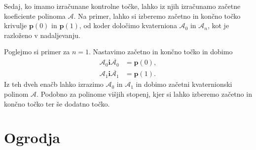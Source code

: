 \documentclass[mat1]{fmfdelo}
\newcommand{\ii}{\boldsymbol i}
\newcommand{\pp}{\boldsymbol p}
\newcommand{\A}{\mathcal A}
\begin{document}
\iffalse
Z višanjem stopnje začetnega polinoma, dobimo več prostih parametrov, kar lahko izkoristimo pri konstrukciji krivulje. Več o tem kasneje.
\fi
Sedaj, ko imamo izračunane kontrolne točke, lahko iz njih izračunamo začetne koeficiente polinoma $\A$. Na primer, lahko si izberemo začetno in končno točko krivulje $\pp(0)$ in $\pp(1)$, od koder določimo kvaterniona $\A_0$ in  $\A_n$, kot je razloženo v nadaljevanju.
\begin{primer}Poglejmo si primer za	$n=1$. Nastavimo začetno in končno točko in dobimo
	\begin{equation*}
	\begin{split}
		\A_0\ii\overline{\A_0} &= \pp(0), \\
		\A_1\ii\overline{\A_1} &= \pp(1).
	\end{split}
\end{equation*}
Iz teh dveh enačb lahko izrazimo $\A_0$ in $\A_1$ in dobimo začetni kvaternionski polinom $\A$. Podobno za polinome višjih stopenj, kjer si lahko izberemo začetno in končno točko ter še dodatno točko.	
\end{primer}
\section{Ogrodja}
\end{document}
